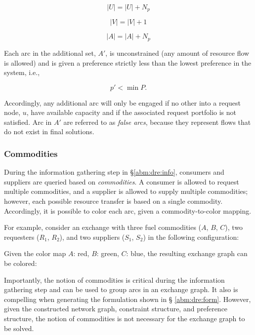 \begin{equation}
  \left|{U}\right| = \left|{U}\right| + N_{p}
\end{equation}

\begin{equation}
  \left|{V}\right| = \left|{V}\right| + 1
\end{equation}

\begin{equation}
  \left|{A}\right| = \left|{A}\right| + N_{p}
\end{equation}

Each arc in the additional set, $A'$, is unconstrained (any amount of resource
flow is allowed) and is given a preference strictly less than the lowest
preference in the system, i.e.,

\begin{equation}
  p' < \min P.
\end{equation}

Accordingly, any additional arc will only be engaged if no other into a request
node, $u$, have available capacity and if the associated request portfolio is
not satisfied. Arc in $A'$ are referred to as \textit{false arcs}, because they
represent flows that do not exist in final solutions.


\subsubsection{Commodities}

During the information gathering step in \S \ref{abm:dre:info}, consumers and
suppliers are queried based on \textit{commodities}. A consumer is allowed to
request multiple commodities, and a supplier is allowed to supply multiple
commodities; however, each possible resource transfer is based on a single
commodity. Accordingly, it is possible to color each arc, given a
commodity-to-color mapping.

For example, consider an exchange with three fuel commodities ($A$, $B$, $C$),
two requesters ($R_1$, $R_2$), and two suppliers ($S_1$, $S_2$) in the following
configuration:


Given the color map $A$: red, $B$: green, $C$: blue, the resulting exchange
graph can be colored:


Importantly, the notion of commodities is critical during the information
gathering step and can be used to group arcs in an exchange graph. It also is
compelling when generating the formulation shown in \S
\ref{abm:dre:form}. However, given the constructed network graph, constraint
structure, and preference structure, the notion of commodities is not necessary
for the exchange graph to be solved.

